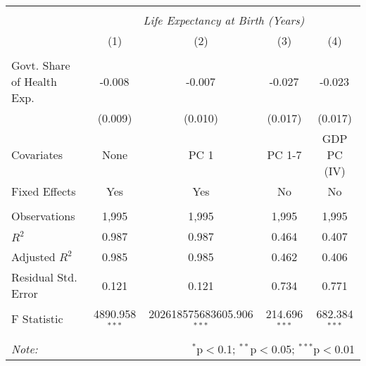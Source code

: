 \begin{table}[!htbp] \centering
\begin{tabular}{@{\extracolsep{5pt}}lcccc}
\\[-1.8ex]\hline
\hline \\[-1.8ex]
& \multicolumn{4}{c}{\textit{Life Expectancy at Birth (Years)}} \
\cr \
\\[-1.8ex] & (1) & (2) & (3) & (4) \\
\hline \\[-1.8ex]
 Govt. Share of Health Exp. & -0.008$^{}$ & -0.007$^{}$ & -0.027$^{}$ & -0.023$^{}$ \\
  & (0.009) & (0.010) & (0.017) & (0.017) \\
 Covariates & None & PC 1 & PC 1-7 & GDP PC (IV) \\
 Fixed Effects & Yes & Yes & No & No \\
\hline \\[-1.8ex]
 Observations & 1,995 & 1,995 & 1,995 & 1,995 \\
 $R^2$ & 0.987 & 0.987 & 0.464 & 0.407 \\
 Adjusted $R^2$ & 0.985 & 0.985 & 0.462 & 0.406 \\
 Residual Std. Error & 0.121 & 0.121 & 0.734 & 0.771  \\
 F Statistic & 4890.958$^{***}$  & 202618575683605.906$^{***}$  & 214.696$^{***}$  & 682.384$^{***}$  \\
\hline
\hline \\[-1.8ex]
\textit{Note:} & \multicolumn{4}{r}{$^{*}$p$<$0.1; $^{**}$p$<$0.05; $^{***}$p$<$0.01} \\
\end{tabular}
\end{table}